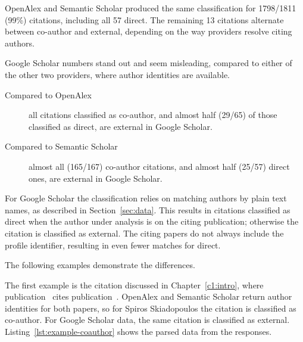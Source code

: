 \textsf{OpenAlex} and \textsf{Semantic Scholar} produced the same classification for 1798/1811 (99\%) citations, including all 57 \textsf{direct}.
The remaining 13 citations alternate between \textsf{co-author} and \textsf{external}, depending on the way providers resolve citing authors.

\textsf{Google Scholar} numbers stand out and seem misleading, compared to either of the other two providers, where author identities are available.

\begin{description}
    \item [Compared to \textsf{OpenAlex}] all citations classified as \textsf{co-author}, and almost half (29/65) of those classified as \textsf{direct}, are \textsf{external} in \textsf{Google Scholar}.
    \item [Compared to \textsf{Semantic Scholar}] almost all (165/167) \textsf{co-author} citations, and almost half (25/57) \textsf{direct} ones, are \textsf{external} in \textsf{Google Scholar}.
\end{description}

For \textsf{Google Scholar} the classification relies on matching authors by plain text names, as described in Section~\ref{sec:data}.
This results in citations classified as \textsf{direct} when the author under analysis is on the citing publication; otherwise the citation is classified as \textsf{external}.
The citing papers do not always include the profile identifier, resulting in even fewer matches for \textsf{direct}.

The following examples demonstrate the differences.

The first example is the citation discussed in Chapter~\ref{c1:intro}, where publication~\cite{Kalnis2007} cites publication~\cite{Ghinita2007}.
\textsf{OpenAlex} and \textsf{Semantic Scholar} return author identities for both papers, so for Spiros Skiadopoulos the citation is classified as \textsf{co-author}.
For \textsf{Google Scholar} data, the same citation is classified as \textsf{external}.
Listing~\ref{lst:example-coauthor} shows the parsed data from the responses.

